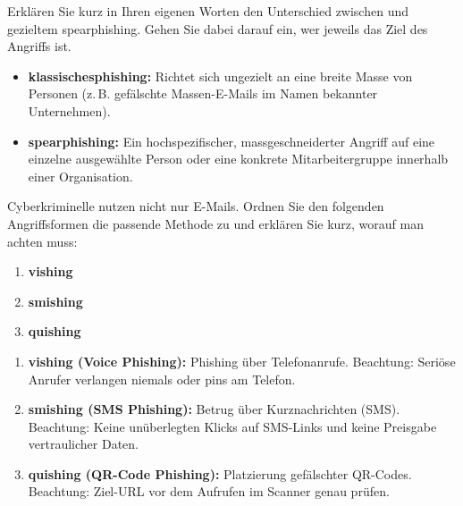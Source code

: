 \documentclass[12pt,a4paper]{article}
\newcounter{subsubsubsection}[subsubsection]
\begin{document}

\begin{taskbox}
Erklären Sie kurz in Ihren eigenen Worten den Unterschied zwischen  und gezieltem \gls{spearphishing}. Gehen Sie dabei darauf ein, wer jeweils das Ziel des Angriffs ist.
\end{taskbox}

\begin{solutionbox}[Musterlösung 2.3.2.1.1]
\begin{itemize}
    \item \textbf{\gls{klassischesphishing}:} Richtet sich ungezielt an eine breite Masse von \mbox{Personen} \newline (z.\,B. gefälschte Massen-E-Mails im Namen bekannter Unternehmen).
    \item \textbf{\gls{spearphishing}:} Ein hochspezifischer, massgeschneiderter Angriff auf eine einzelne ausgewählte Person oder eine konkrete Mitarbeitergruppe innerhalb einer Organisation.
\end{itemize}
\end{solutionbox}

\begin{taskbox}
Cyberkriminelle nutzen nicht nur E-Mails. Ordnen Sie den folgenden Angriffsformen die passende Methode zu und erklären Sie kurz, worauf man achten muss:
\begin{enumerate}[label=\alph*)]
    \item \textbf{\gls{vishing}}
    \item \textbf{\gls{smishing}}
    \item \textbf{\gls{quishing}}
\end{enumerate}
\end{taskbox}

\begin{solutionbox}[Musterlösung 2.3.2.1.2]
\begin{enumerate}[label=\alph*)]
    \item \textbf{\gls{vishing} (Voice Phishing):} Phishing über Telefonanrufe. \newline Beachtung: Seriöse Anrufer verlangen niemals  oder \gls{pin}s am \mbox{Telefon.}
    \item \textbf{\gls{smishing} (SMS Phishing):} Betrug über Kurznachrichten (SMS). \newline Beachtung: Keine unüberlegten Klicks auf SMS-Links und keine Preisgabe vertraulicher Daten.
    \item \textbf{\gls{quishing} (QR-Code Phishing):} Platzierung gefälschter QR-Codes. \newline Beachtung: Ziel-URL vor dem Aufrufen im Scanner genau prüfen.
\end{enumerate}
\end{solutionbox}
\end{document}
